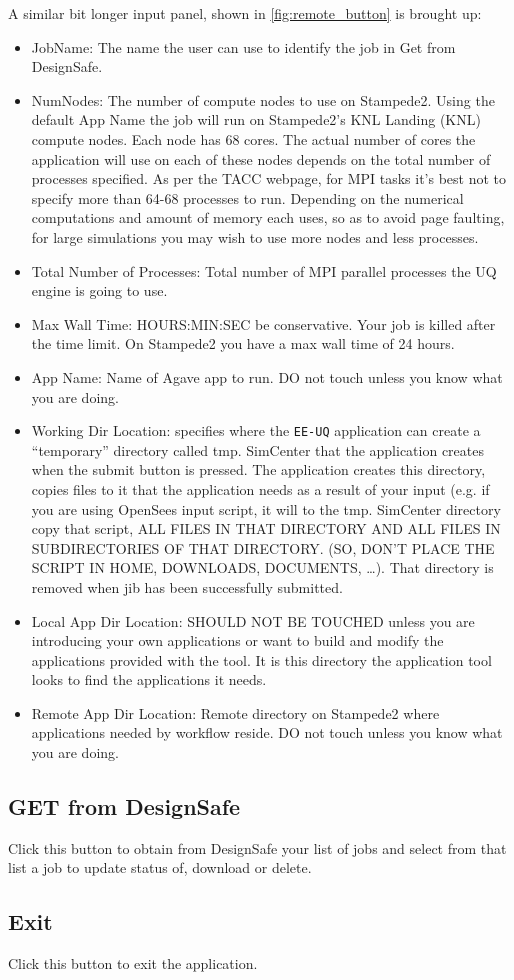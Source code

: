 A similar bit longer input panel, shown in \autoref{fig:remote_button}
is brought up:
\begin{itemize}
\item JobName: The name the user can use to identify the job in Get from DesignSafe.
\item NumNodes: The number of compute nodes to use on Stampede2. Using the default App Name the job will run on Stampede2’s KNL Landing (KNL) 
compute nodes. Each node has 68 cores. The actual number of cores the
application will use on each of these nodes depends on the total
number of processes specified. As per the TACC webpage, for MPI tasks
it’s best not to specify more than 64-68 processes to run. Depending
on the numerical computations and amount of memory each uses, so as to
avoid page faulting, for large simulations you may wish to use more
nodes and less processes.
\item Total Number of Processes: Total number of MPI parallel processes the UQ engine is going to use.
\item Max Wall Time:  HOURS:MIN:SEC be conservative. Your job is killed after the time limit. On Stampede2 you have a max wall time of 24 hours.
\item App Name:   Name of Agave app to run. DO not touch unless you know what you are doing.
\item Working Dir Location: specifies where the \texttt{EE-UQ} application can create a “temporary” directory called tmp. SimCenter that the application 
creates when the submit button is pressed. The application creates
this directory, copies files to it that the application needs as a
result of your input (e.g. if you are using OpenSees input script, it
will to the tmp. SimCenter directory copy that script, ALL FILES IN
THAT DIRECTORY AND ALL FILES IN SUBDIRECTORIES OF THAT DIRECTORY. (SO,
DON’T PLACE THE SCRIPT IN HOME, DOWNLOADS, DOCUMENTS, …). That
directory is removed when jib has been successfully submitted.
\item Local App Dir Location: SHOULD NOT BE TOUCHED unless you are introducing your own applications or want to build and modify the applications 
provided with the tool. It is this directory the application tool
looks to find the applications it needs.
\item Remote App Dir Location: Remote directory on Stampede2 where applications needed by workflow reside. DO not touch unless you know what you are doing.

\end{itemize}

\subsection{GET from DesignSafe}
Click this button to obtain from DesignSafe your list of jobs and
select from that list a job to update status of, download or delete.

\subsection{Exit}
Click this button to exit the application. 
